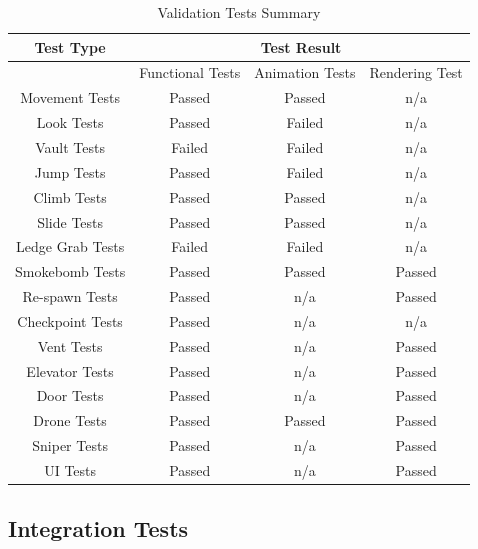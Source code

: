\documentclass[11pt,a4paper]{article}
\begin{document}
\begin{table}[H]
	\caption{Validation Tests Summary}
	\begin{center}
		\begin{tabular}{ |c|c|c|c| } 
			\hline
			Test Type & \multicolumn{3}{|c|}{Test Result}\\ \hline
			& Functional Tests & Animation Tests & Rendering Test\\ \hline
			Movement Tests & Passed & Passed & n/a\\ \hline
			Look Tests & Passed & Failed & n/a\\ \hline
			Vault Tests & Failed & Failed & n/a\\ \hline
			Jump Tests & Passed & Failed & n/a\\ \hline
			Climb Tests & Passed & Passed & n/a\\ \hline
			Slide Tests & Passed & Passed & n/a\\ \hline
			Ledge Grab Tests & Failed & Failed & n/a\\ \hline
			Smokebomb Tests & Passed & Passed & Passed\\ \hline
			Re-spawn Tests & Passed & n/a & Passed\\ \hline
			Checkpoint Tests & Passed & n/a & n/a\\ \hline
			Vent Tests & Passed & n/a & Passed\\ \hline
			Elevator Tests & Passed & n/a & Passed\\ \hline
			Door Tests & Passed & n/a & Passed\\ \hline
			Drone Tests & Passed & Passed & Passed\\ \hline
			Sniper Tests & Passed & n/a & Passed\\ \hline
			UI Tests & Passed & n/a & Passed\\ \hline
		\end{tabular}
	\end{center}
\end{table}

\subsection{Integration Tests}
\end{document}
